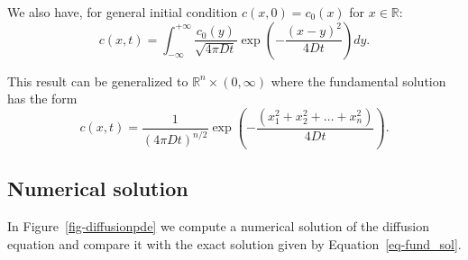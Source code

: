 \documentclass[
  letterpaper,
  DIV=11,
  numbers=noendperiod]{scrreprt}
\theoremstyle{plain}
\theoremstyle{definition}
\theoremstyle{plain}
\theoremstyle{remark}
\begin{document}
We also have, for general initial condition \(c(x, 0) = c_0(x)\) for
\(x\in \mathbb R\): \[
c(x, t) = \int_{-\infty}^{+\infty} \frac{c_0(y)}{\sqrt{4 \pi D t}} \exp \left( - \frac{ (x-y)^2}{ 4Dt} \right) dy.
\]

This result can be generalized to \(\mathbb R^n\times (0,\infty)\) where
the fundamental solution has the form \[
c(x,t) =  \frac 1{(4 \pi D t)^{n/2}} \exp \left( - \frac{ (x_{1}^{2} + x_{2}^{2} + \ldots + x_{n}^{2})}{ 4Dt} \right).
\]

\hypertarget{numerical-solution}{%
\subsection{Numerical solution}\label{numerical-solution}}

In Figure~\ref{fig-diffusionpde} we compute a numerical solution of the
diffusion equation and compare it with the exact solution given by
Equation~\ref{eq-fund_sol}.
\end{document}
